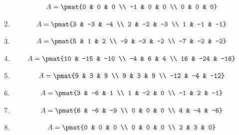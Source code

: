 \begin{enumerate}
\begin{align*}
A = \pmat{0 & 0 & 0 \\ -1 & 0 & 0 \\ 0 & 0 & 0}
\end{align*}

\item

\begin{align*}
A = \pmat{3 & -3 & -4 \\ 2 & -2 & -3 \\ 1 & -1 & -1}
\end{align*}

\item

\begin{align*}
A = \pmat{5 & 1 & 2 \\ -9 & -3 & -2 \\ -7 & -2 & -2}
\end{align*}

\item

\begin{align*}
A = \pmat{10 & -15 & -10 \\ -4 & 6 & 4 \\ 16 & -24 & -16}
\end{align*}

\item

\begin{align*}
A = \pmat{9 & 3 & 9 \\ 9 & 3 & 9 \\ -12 & -4 & -12}
\end{align*}

\item

\begin{align*}
A = \pmat{3 & -6 & 1 \\ 1 & -2 & 0 \\ -1 & 2 & -1}
\end{align*}

\item

\begin{align*}
A = \pmat{6 & -6 & -9 \\ 0 & 0 & 0 \\ 4 & -4 & -6}
\end{align*}

\item

\begin{align*}
A = \pmat{0 & 0 & 0 \\ 0 & 0 & 0 \\ 2 & 3 & 0}
\end{align*}


\end{enumerate}

